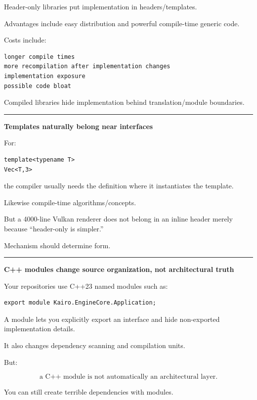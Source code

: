Header-only libraries put implementation in headers/templates.

Advantages include easy distribution and powerful compile-time generic code.

Costs include:

\begin{verbatim}
longer compile times
more recompilation after implementation changes
implementation exposure
possible code bloat
\end{verbatim}

Compiled libraries hide implementation behind translation/module boundaries.

\begin{center}\rule{0.5\linewidth}{0.5pt}\end{center}

\textbf{Templates naturally belong near interfaces}

For:

\begin{verbatim}
template<typename T>
Vec<T,3>
\end{verbatim}

the compiler usually needs the definition where it instantiates the template.

Likewise compile-time algorithms/concepts.

But a 4000-line Vulkan renderer does not belong in an inline header merely because ``header-only is simpler.''

Mechanism should determine form.

\begin{center}\rule{0.5\linewidth}{0.5pt}\end{center}

\textbf{C++ modules change source organization, not architectural truth}

Your repositories use C++23 named modules such as:

\begin{verbatim}
export module Kairo.EngineCore.Application;
\end{verbatim}

A module lets you explicitly export an interface and hide non-exported implementation details.

It also changes dependency scanning and compilation units.

But:

\[
\boxed{
\text{a C++ module is not automatically an architectural layer}.
}
\]

You can still create terrible dependencies with modules.

